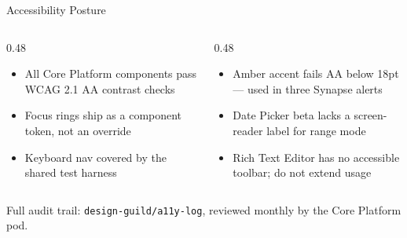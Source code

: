 \documentclass[aspectratio=169,10pt]{beamer}
\begin{document}
\begin{frame}{Accessibility Posture}
  \begin{columns}[T]
    \begin{column}{0.48\textwidth}
      \begin{tcolorbox}[colback=nexateal!8, colframe=nexateal, title=Holding the line,
          fonttitle=\bfseries\small, coltitle=nexacanvas, boxrule=0.6pt, arc=2pt]
        \small
        \begin{itemize}
          \item All Core Platform components pass WCAG 2.1 AA contrast checks
          \item Focus rings ship as a component token, not an override
          \item Keyboard nav covered by the shared test harness
        \end{itemize}
      \end{tcolorbox}
    \end{column}
    \begin{column}{0.48\textwidth}
      \begin{tcolorbox}[colback=nexaamber!12, colframe=nexaamber, title=Open risks,
          fonttitle=\bfseries\small, coltitle=nexaink, boxrule=0.6pt, arc=2pt]
        \small
        \begin{itemize}
          \item Amber accent fails AA below 18pt --- used in three Synapse alerts
          \item Date Picker beta lacks a screen-reader label for range mode
          \item Rich Text Editor has no accessible toolbar; do not extend usage
        \end{itemize}
      \end{tcolorbox}
    \end{column}
  \end{columns}
  \vfill
  \par
  {\scriptsize\color{nexagray}Full audit trail: \texttt{design-guild/a11y-log}, reviewed monthly
  by the Core Platform pod.}
\end{frame}
\end{document}
